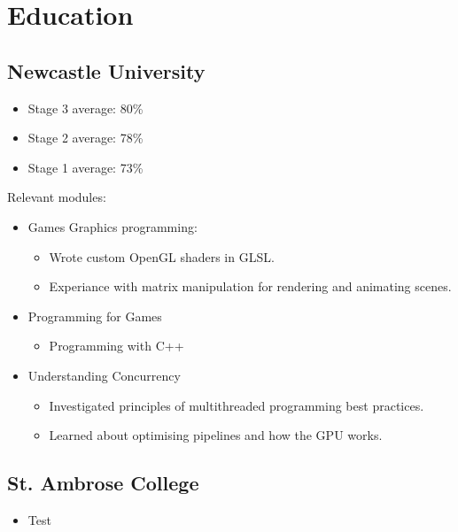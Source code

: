 \section*{Education}

\subsection*{Newcastle University}
\begin{itemize}
  \item Stage 3 average: 80\%
  \item Stage 2 average: 78\%
  \item Stage 1 average: 73\%
\end{itemize}

Relevant modules:
\begin{itemize}
  \item Games Graphics programming:
    \begin{itemize}
      \item Wrote custom OpenGL shaders in GLSL.
      \item Experiance with matrix manipulation for rendering and animating scenes.
    \end{itemize}
  \item Programming for Games
    \begin{itemize}
      \item Programming with C++
    \end{itemize}
  \item Understanding Concurrency
    \begin{itemize}
      \item Investigated principles of multithreaded programming best practices.
      \item Learned about optimising pipelines and how the GPU works.
    \end{itemize}
\end{itemize}


\subsection*{St. Ambrose College}
\begin{itemize}
    \item Test
\end{itemize}
